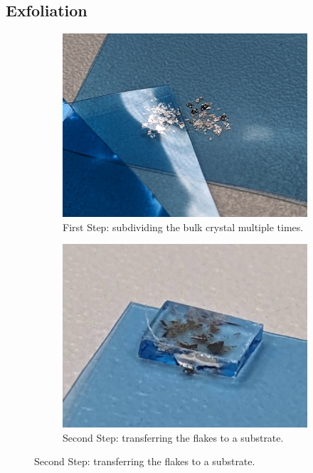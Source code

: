 \documentclass[
	twoside,
	parskip=half,
	a4paper,
]{scrbook}
\begin{document}
\subsection{Exfoliation}
\begin{figure}[h]
	\centering
	\begin{subfigure}[t]{.3\textwidth}
		\vskip 0pt
		\includegraphics[width=\textwidth]{../../photos/exfoliation.jpg}
		\caption{First Step: subdividing the bulk crystal multiple times.}
		\label{fig:exfoliation_division}
	\end{subfigure}
	\begin{subfigure}[t]{.3\textwidth}
		\vskip 0pt
		\includegraphics[width=\textwidth]{../../photos/exfoliation glass.jpg}
		\caption{Second Step: transferring the flakes to a substrate.}

\end{subfigure}
\end{figure}
\end{document}
